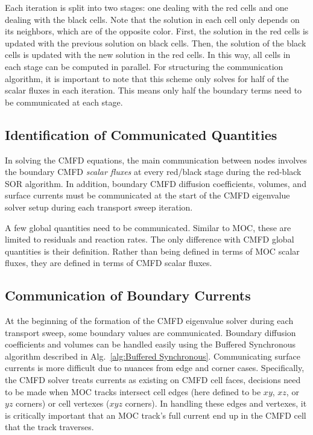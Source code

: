 Each iteration is split into two stages: one dealing with the red cells and one dealing with the black cells. Note that the solution in each cell only depends on its neighbors, which are of the opposite color. First, the solution in the red cells is updated with the previous solution on black cells. Then, the solution of the black cells is updated with the new solution in the red cells. In this way, all cells in each stage can be computed in parallel. For structuring the communication algorithm, it is important to note that this scheme only solves for half of the scalar fluxes in each iteration. This means only half the boundary terms need to be communicated at each stage.

\subsection{Identification of Communicated Quantities}

In solving the \ac{CMFD} equations, the main communication between nodes involves the boundary \ac{CMFD} \textit{scalar fluxes} at every red/black stage during the red-black SOR algorithm. In addition, boundary \ac{CMFD} diffusion coefficients, volumes, and surface currents must be communicated at the start of the \ac{CMFD} eigenvalue solver setup during each transport sweep iteration.

A few global quantities need to be communicated. Similar to \ac{MOC}, these are limited to residuals and reaction rates. The only difference with \ac{CMFD} global quantities is their definition. Rather than being defined in terms of \ac{MOC} scalar fluxes, they are defined in terms of \ac{CMFD} scalar fluxes.


\subsection{Communication of Boundary Currents}

At the beginning of the formation of the \ac{CMFD} eigenvalue solver during each transport sweep, some boundary values are communicated. Boundary diffusion coefficients and volumes can be handled easily using the Buffered Synchronous algorithm described in Alg.~\ref{alg:Buffered Synchronous}. Communicating surface currents is more difficult due to nuances from edge and corner cases. Specifically, the \ac{CMFD} solver treats currents as existing on CMFD cell faces, decisions need to be made when \ac{MOC} tracks intersect cell edges (here defined to be $xy$, $xz$, or $yz$ corners) or cell vertexes ($xyz$ corners). In handling these edges and vertexes, it is critically important that an \ac{MOC} track's full current end up in the CMFD cell that the track traverses.

